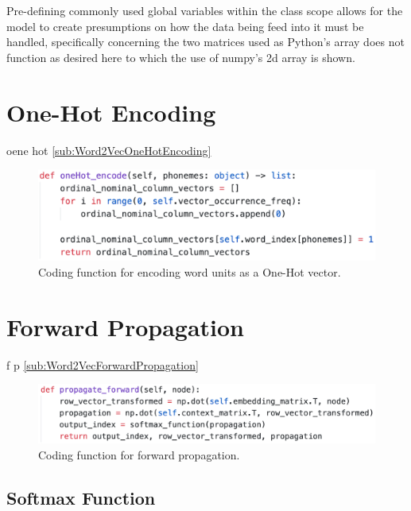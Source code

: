 Pre-defining commonly used global variables within the class scope allows for the model to create presumptions on how the data being feed into it must be handled, specifically concerning the two matrices used as Python's array does not function as desired here to which the use of numpy's 2d array is shown.

\section{One-Hot Encoding}

oene hot \autoref{sub:Word2VecOneHotEncoding}

\begin{figure}[H]
    \centering
    \includegraphics[width=\textwidth]{figures/chapter-6/OneHotEncoding.png}
    \caption[Coding function for encoding word units as a One-Hot vector]{Coding function for encoding word units as a One-Hot vector.
    \label{fig:onehot_encoding}}
\end{figure}

\section{Forward Propagation}

f p \autoref{sub:Word2VecForwardPropagation}

\begin{figure}[H]
    \centering
    \includegraphics[width=\textwidth]{figures/chapter-6/forwardpropagation.png}
    \caption[Coding function for forward propagation]{Coding function for forward propagation.
    \label{fig:forwardpropagation}}
\end{figure}

\subsection{Softmax Function}




